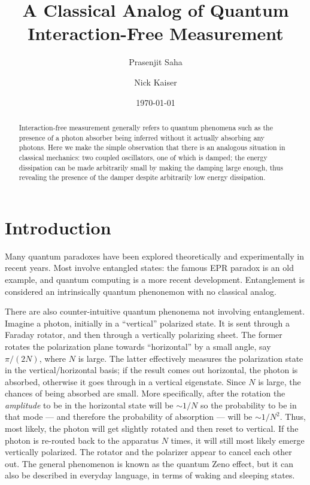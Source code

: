 \documentclass[12pt,aps,prb,preprint]{revtex4}
\begin{document}
\title{A Classical Analog of Quantum Interaction-Free Measurement}

\author{Prasenjit Saha}
\author{Nick Kaiser}

\date{\today}

\begin{abstract}
Interaction-free measurement generally refers to quantum phenomena
such as the presence of a photon absorber being inferred without it
actually absorbing any photons.  Here we make the simple observation
that there is an analogous situation in classical mechanics: two
coupled oscillators, one of which is damped; the energy dissipation
can be made arbitrarily small by making the damping large enough, thus
revealing the presence of the damper despite arbitrarily low energy
dissipation.
\end{abstract}

\maketitle

\section{Introduction}

Many quantum paradoxes have been explored theoretically and
experimentally in recent years.  Most involve entangled states: the
famous EPR paradox is an old example, and quantum computing is a more
recent development\cite{2007qucosc.book}.  Entanglement is considered
an intrinsically quantum phenonemon with no classical analog.

There are also counter-intuitive quantum phenonema not involving
entanglement.  Imagine a photon, initially in a ``vertical'' polarized
state.  It is sent through a Faraday rotator, and then through a
vertically polarizing sheet.  The former rotates the polarization
plane towards ``horizontal'' by a small angle, say $\pi/(2N)$, where
$N$ is large.  The latter effectively measures the polarization state
in the vertical/horizontal basis; if the result comes out horizontal,
the photon is absorbed, otherwise it goes through in a vertical
eigenstate.  Since $N$ is large, the chances of being absorbed are
small.  More specifically, after the rotation the {\em amplitude\/} to
be in the horizontal state will be $\sim1/N$ so the probability to be
in that mode --- and therefore the probability of absorption --- will
be $\sim1/N^2$.  Thus, most likely, the photon will get slightly
rotated and then reset to vertical.  If the photon is re-routed back
to the apparatus $N$ times, it will still most likely emerge
vertically polarized.  The rotator and the polarizer appear to cancel
each other out.  The general phenomenon is known as the quantum Zeno
effect,\cite{1977JMP....18..756M,PhysRevA.41.2295} but it can also be
described in everyday language, in terms of waking and sleeping
states.\cite{orzel2009teach}
\end{document}
